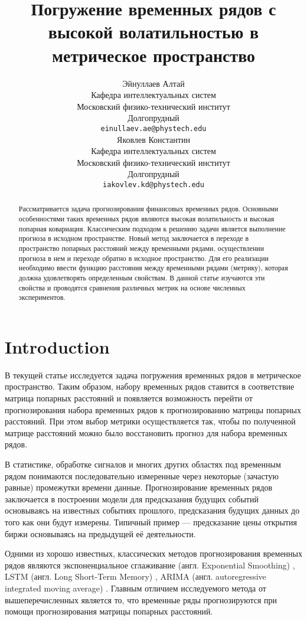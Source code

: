 \documentclass{article}
\title{Погружение временных рядов с высокой волатильностью в метрическое пространство}
\author{ Эйнуллаев Алтай \\
	Кафедра интеллектуальных систем\\
	Московский физико-технический институт\\
	Долгопрудный \\
	\texttt{einullaev.ae@phystech.edu} \\
	\And
	Яковлев Константин \\
	Кафедра интеллектуальных систем\\
	Московский физико-технический институт\\
	Долгопрудный \\
	\texttt{iakovlev.kd@phystech.edu} \\
}
\date{}
\begin{document}
\maketitle

\begin{abstract}
	Рассматривается задача прогнозирования финансовых временных рядов. Основными особенностями таких временных рядов являются высокая волатильность и высокая попарная ковариация. Классическим подходом к решению задачи является выполнение прогноза в исходном пространстве. Новый метод заключается в переходе в пространство попарных расстояний между временными рядами, осуществлении прогноза в нем и переходе обратно в исходное пространство. Для его реализации необходимо ввести функцию расстояния между временными рядами (метрику), которая должна удовлетворять определенным свойствам. В данной статье изучаются  эти свойства и проводятся сравнения различных метрик на основе численных экспериментов.

\end{abstract}



\section{Introduction}

В текущей статье исследуется задача погружения временных рядов в метрическое пространство. Таким образом, набору временных рядов ставится в соответствие матрица попарных расстояний и появляется возможность перейти от прогнозирования набора временных рядов к прогнозированию матрицы попарных расстояний. При этом выбор метрики осуществляется так, чтобы по полученной матрице расстояний можно было восстановить прогноз для набора временных рядов.

В статистике, обработке сигналов и многих других областях под временным рядом понимаются последовательно измеренные через некоторые (зачастую равные) промежутки времени данные. Прогнозирование временных рядов заключается в построении модели для предсказания будущих событий основываясь на известных событиях прошлого, предсказания будущих данных до того как они будут измерены. Типичный пример — предсказание цены открытия биржи основываясь на предыдущей её деятельности.

Одними из хорошо известных, классических методов прогнозирования временных рядов являются экспоненциальное сглаживание (англ. Exponential Smoothing) \cite{ES}, LSTM (англ. Long Short-Term Memory) \cite{LSTM}, ARIMA  (англ. autoregressive integrated moving average) \cite{ARIMA}. Главным отличием исследуемого метода от вышеперечисленных является то, что временные ряды прогнозируются при помощи прогнозирования матрицы попарных расстояний.
\end{document}
